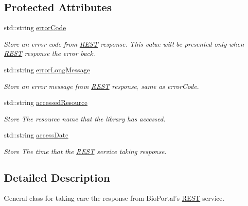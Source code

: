 \subsection*{Protected Attributes}
\begin{DoxyCompactItemize}
\item 
std\-::string \hyperlink{classunisys_1_1RestBioPortalResult_a05d2659a4f59d8e2e590cae364e8d8a3}{error\-Code}
\begin{DoxyCompactList}\small\item\em Store an error code from \hyperlink{classunisys_1_1REST}{R\-E\-S\-T} response. This value will be presented only when \hyperlink{classunisys_1_1REST}{R\-E\-S\-T} response the error back. \end{DoxyCompactList}\item 
std\-::string \hyperlink{classunisys_1_1RestBioPortalResult_acf0c58c40a61e51d925a12cd1d363706}{error\-Long\-Message}
\begin{DoxyCompactList}\small\item\em Store an error message from \hyperlink{classunisys_1_1REST}{R\-E\-S\-T} response, same as error\-Code. \end{DoxyCompactList}\item 
std\-::string \hyperlink{classunisys_1_1RestBioPortalResult_a38a4f0567088f5ab6dc61d0943a7c4ed}{accessed\-Resource}
\begin{DoxyCompactList}\small\item\em Store The resource name that the library has accessed. \end{DoxyCompactList}\item 
std\-::string \hyperlink{classunisys_1_1RestBioPortalResult_a67d51545778745539af85cb77d53b621}{access\-Date}
\begin{DoxyCompactList}\small\item\em Store The time that the \hyperlink{classunisys_1_1REST}{R\-E\-S\-T} service taking response. \end{DoxyCompactList}\end{DoxyCompactItemize}


\subsection{Detailed Description}
General class for taking care the response from Bio\-Portal's \hyperlink{classunisys_1_1REST}{R\-E\-S\-T} service. 

